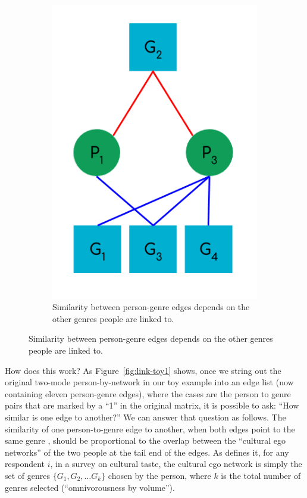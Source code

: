 \documentclass[a4paper,12pt]{extarticle}
\begin{document}
\begin{figure}[t!]
\begin{subfigure}[b]{0.3\textwidth}
        \includegraphics[width=1.0\textwidth]{Toy/link-clust-toy2.png}
        \caption{Similarity between person-genre edges depends on the other genres people are linked to.}
        \label{fig:link-toy2}
    \end{subfigure}
\end{figure}
 
How does this work? As Figure~\ref{fig:link-toy1} shows, once we string out the original two-mode person-by-network in our toy example into an edge list (now containing eleven person-genre edges), where the cases are the person to genre pairs that are marked by a ``1'' in the original matrix, it is possible to ask: ``How similar is one edge to another?'' We can answer that question as follows. The similarity of one person-to-genre edge to another, when both edges point to the same genre \citep{ahn_etal10}, should be proportional to the overlap between the ``cultural ego networks'' of the two people at the tail end of the edges. As \citet{lizardo14} defines it, for any respondent $i$, in a survey on cultural taste, the cultural ego network is simply the set of genres $\{G_1, G_2,\dots G_k\}$ chosen by the person, where $k$ is the total number of genres selected (``omnivorousness by volume''). 
\end{document}
